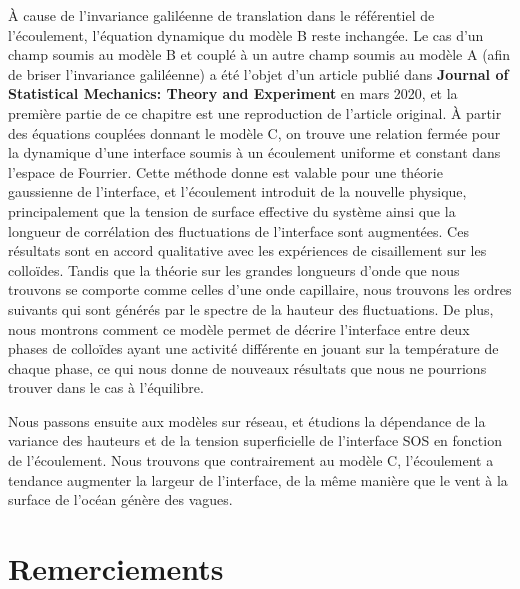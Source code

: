 À cause de l'invariance galiléenne de translation dans le référentiel de l'écoulement, l'équation dynamique du modèle B reste inchangée. Le cas d'un champ soumis au modèle B et couplé à un autre champ soumis au modèle A (afin de briser l'invariance galiléenne) a été l'objet d'un article publié dans {\bf Journal of Statistical Mechanics: Theory and Experiment} en mars 2020, et la première partie de ce chapitre est une reproduction de l'article original. À partir des équations couplées donnant le modèle C, on trouve une relation fermée pour la dynamique d'une interface soumis à un écoulement uniforme et constant dans l'espace de Fourrier. Cette méthode donne est valable pour une théorie gaussienne de l'interface, et l'écoulement introduit de la nouvelle physique, principalement que la tension de surface effective du système ainsi que la longueur de corrélation des fluctuations de l'interface sont augmentées. Ces résultats sont en accord qualitative avec les expériences de cisaillement sur les colloïdes. Tandis que la théorie sur les grandes longueurs d'onde que nous trouvons se comporte comme celles d'une onde capillaire, nous trouvons les ordres suivants qui sont générés par le spectre de la hauteur des fluctuations. De plus, nous montrons comment ce modèle permet de décrire l'interface entre deux phases de colloïdes ayant une activité différente en jouant sur la température de chaque phase, ce qui nous donne de nouveaux résultats que nous ne pourrions trouver dans le cas à l'équilibre.

Nous passons ensuite aux modèles sur réseau, et étudions la dépendance de la variance des hauteurs et de la tension superficielle de l'interface SOS en fonction de l'écoulement. Nous trouvons que contrairement au modèle C, l'écoulement a tendance augmenter la largeur de l'interface, de la même manière que le vent à la surface de l'océan génère des vagues.

\cleardoublepage
\chapter*{Remerciements}

